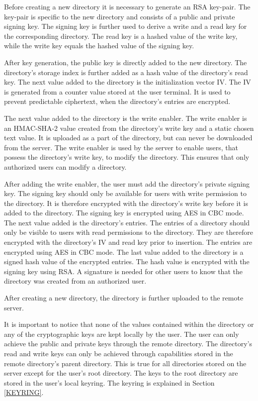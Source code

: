 \documentclass[pdftex,english,10pt,b5paper,twoside]{book}
\begin{document}
Before creating a new directory it is necessary to generate an RSA key-pair. The
key-pair is specific to the new directory and consists of a public and private
signing key. The signing key is further used to derive a write and a read key
for the corresponding directory. The read key is a hashed value of the write
key, while the write key equals the hashed value of the signing  key. 

After key generation, the public key is directly added to the new directory. The
directory's storage index is further added as a hash value of the directory's
read key. The next value added to the directory is the initialization vector
\ac{IV}. The IV is generated from a counter value stored at the user terminal. It
is used to prevent predictable ciphertext, when the directory's entries are encrypted.

The next value added to the directory is the write enabler. The write enabler is
an HMAC-SHA-2 value created from the directory's write key and a static chosen
text value. It is uploaded as a part of the directory, but can never be
downloaded from the server. The write enabler is used by the server to enable
users, that possess the directory's write key, to modify the directory. This
ensures that only authorized users can modify a directory.

After adding the write enabler, the user must add the directory's private
signing key. The signing key should only be available for users with write
permission to the directory. It is therefore encrypted with the directory's
write key before it is added to the directory. The signing key is encrypted using \ac{AES} in
\ac{CBC} mode. The next value added is the directory's entries. The entries of a
directory should only be visible to users with read permissions to
the directory. They are therefore encrypted with the directory's \ac{IV} and read
key prior to insertion. The entries are encrypted using \ac{AES} in \ac{CBC} mode. The
last value added to the directory is a signed hash value of the encrypted
entries. The hash value is encrypted with the signing key using \ac{RSA}. A
signature is needed for other users to know that the directory was created from
an authorized user.

After creating a new directory, the directory is further uploaded to the remote
server.

It is important to notice that none of the values contained within the
directory or any of the cryptographic keys are kept locally by the user. The
user can only achieve the public and private keys through the remote directory.
The directory's read and write keys can only be achieved through capabilities stored
in the remote directory's parent directory. This is true for all directories
stored on the server except for the user's root directory. The keys to the
root directory are stored in the user's local keyring. The keyring is explained
in Section \ref{KEYRING}.
\end{document}
